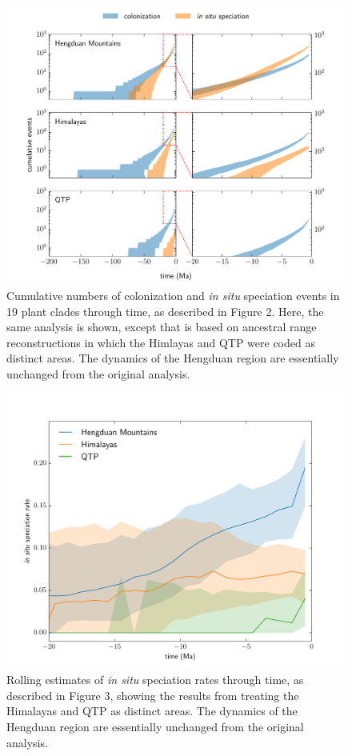 \begin{figure}
\centering
\includegraphics[width=.99\linewidth]{figures/cumulative-events-qtp.pdf}
\caption{Cumulative numbers of colonization and \textit{in situ}
  speciation events in 19 plant clades through time, as described in
  Figure 2. Here, the same analysis is shown, except that is based on
  ancestral range reconstructions in which the Himlayas and QTP were
  coded as distinct areas. The dynamics of the Hengduan region are
  essentially unchanged from the original analysis.}
\label{fig:cumevents:qtp}
\end{figure}

\begin{figure}
\centering
\includegraphics[width=.99\linewidth]{figures/speciation-rates-qtp.pdf}
\caption{Rolling estimates of \textit{in situ} speciation rates
  through time, as described in Figure 3, showing the results from
  treating the Himalayas and QTP as distinct areas. The dynamics of
  the Hengduan region are essentially unchanged from the original
  analysis.}
\label{fig:speciation:qtp}
\end{figure}

